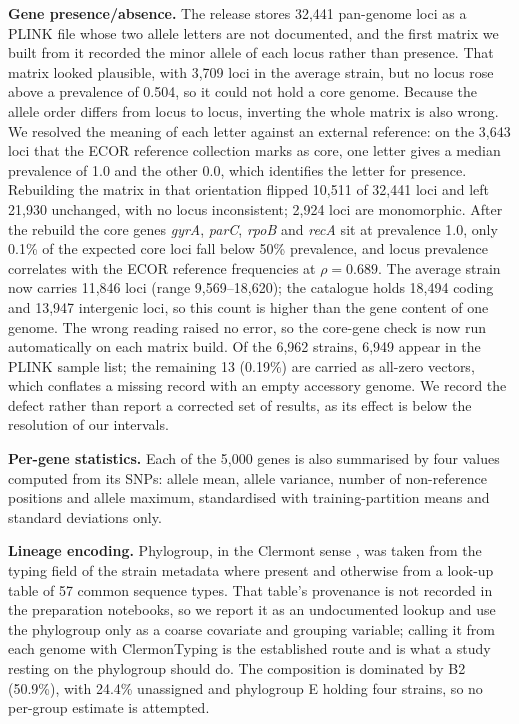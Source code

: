 \textbf{Gene presence/absence.} The release stores 32,441 pan-genome loci as a PLINK file whose two
allele letters are not documented, and the first matrix we built from it recorded the minor allele
of each locus rather than presence. That matrix looked plausible, with 3,709 loci in the average
strain, but no locus rose above a prevalence of 0.504, so it could not hold a core genome. Because
the allele order differs from locus to locus, inverting the whole matrix is also wrong. We resolved
the meaning of each letter against an external reference: on the 3,643 loci that the ECOR reference
collection marks as core, one letter gives a median prevalence of 1.0 and the other 0.0, which
identifies the letter for presence. Rebuilding the matrix in that orientation flipped 10,511 of
32,441 loci and left 21,930 unchanged, with no locus inconsistent; 2,924 loci are monomorphic. After
the rebuild the core genes \textit{gyrA}, \textit{parC}, \textit{rpoB} and \textit{recA} sit at
prevalence 1.0, only 0.1\% of the expected core loci fall below 50\% prevalence, and locus prevalence
correlates with the ECOR reference frequencies at $\rho = 0.689$. The average strain now carries
11,846 loci (range 9,569--18,620); the catalogue holds 18,494 coding and 13,947 intergenic loci,
so this count is higher than the gene content of one genome. The wrong reading raised no error, so the core-gene check is now
run automatically on each matrix build. Of the 6,962 strains, 6,949 appear in the PLINK sample list;
the remaining 13 (0.19\%) are carried as all-zero vectors, which conflates a missing record with an
empty accessory genome. We record the defect rather than report a corrected set of results, as its
effect is below the resolution of our intervals.

\textbf{Per-gene statistics.} Each of the 5,000 genes is also summarised by four values computed
from its SNPs: allele mean, allele variance, number of non-reference positions and allele maximum,
standardised with training-partition means and standard deviations only.

\textbf{Lineage encoding.} Phylogroup, in the Clermont sense \cite{clermont2013phylotyping}, was
taken from the typing field of the strain metadata where present and otherwise from a look-up table
of 57 common sequence types. That table's provenance is not recorded in the preparation notebooks,
so we report it as an undocumented lookup and use the phylogroup only as a coarse covariate and
grouping variable; calling it from each genome with ClermonTyping \cite{beghain2018clermontyping}
is the established route and is what a study resting on the phylogroup should do. The composition
is dominated by B2 (50.9\%), with 24.4\% unassigned and phylogroup E holding four strains, so no
per-group estimate is attempted.

